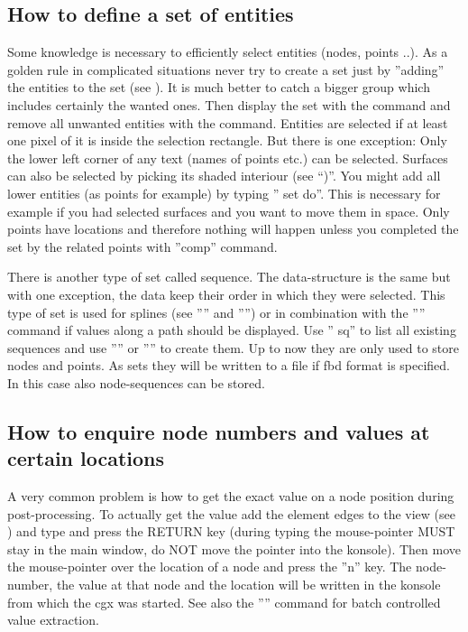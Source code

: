 \documentclass{article}
\begin{document}
\begin{appendix}
\subsection{\label{How to define a set of entities}How to define a set of entities}
Some knowledge is necessary to efficiently select entities (nodes, points ..). As a golden rule in complicated situations never try to create a set just by ''adding'' the entities to the set (see ). It is much better to catch a bigger group which includes certainly the wanted ones. Then display the set with the  command and remove all unwanted entities with the  command. Entities are selected if at least one pixel of it is inside the selection rectangle. But there is one exception: Only the lower left corner of any text (names of points etc.) can be selected. Surfaces can also be selected by picking its shaded interiour (see ``)''. You might add all lower entities (as points for example) by typing '' set do''. This is necessary for example if you had selected surfaces and you want to move them in space. Only points have locations and therefore nothing will happen unless you completed the set by the related points with ''comp'' command.

There is another type of set called sequence. The data-structure is the same but with one exception, the data keep their order in which they were selected. This type of set is used for splines (see '''' and '''') or in combination with the '''' command if values along a path should be displayed. Use '' sq'' to list all existing sequences and use '''' or '''' to create them. Up to now they are only used to store nodes and points. As sets they will be written to a file if fbd format is specified. In this case also node-sequences can be stored.

\subsection{\label{How to enquire node numbers and values at certain locations}How to enquire node numbers and values at certain locations}
A very common problem is how to get the exact value on a node position during post-processing. To actually get the value add the element edges to the view (see ) and type  and press the RETURN key (during typing the mouse-pointer MUST stay in the main window, do NOT move the pointer into the konsole). Then move the mouse-pointer over the location of a node and press the ''n'' key. The node-number, the value at that node and the location will be written in the konsole from which the cgx was started. See also the '''' command for batch controlled value extraction.


\end{appendix}
\end{document}
